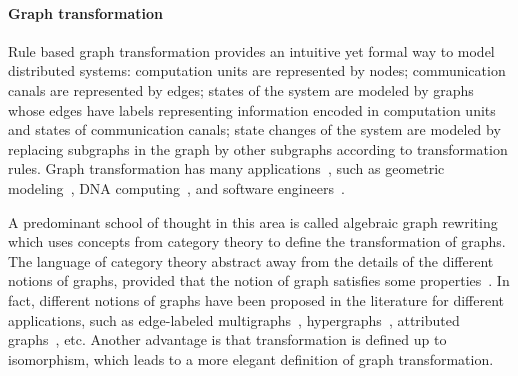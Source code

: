  \paragraph{Graph transformation}
 Rule based graph transformation provides an intuitive yet formal way to model distributed systems: computation units are represented by nodes; communication canals are represented by edges; states of the system are modeled by graphs whose edges have labels representing information encoded in computation units and states of communication canals; state changes of the system are modeled by replacing subgraphs in the graph by other subgraphs according to transformation rules. Graph transformation has many applications~\cite{ehrig1999handbook2, ehrig2006fundamentals}, such as geometric modeling~\cite{pascale2022Geometric_modeling}, DNA computing~\cite{harju2004tutorial_dna_computation}, and software engineers~\cite{heckel2020software_engineers}.
 
 A predominant school of thought in this area is called algebraic graph rewriting which uses concepts from category theory to define the transformation of graphs. The language of category theory abstract away from the details of the different notions of graphs, provided that the notion of graph satisfies some properties~\cite{lack2004adhesive,overbeek2023graph}. 
 In fact, different notions of graphs have been proposed in the literature for different applications, such as edge-labeled multigraphs~\cite{konig2018atutorial,corradini1997algebraic}, hypergraphs~\cite{plump1993hypergraph}, attributed graphs~\cite{ehrig2006fundamentals}, etc. Another advantage is that transformation is defined up to isomorphism, which leads to a more elegant definition of graph transformation.


